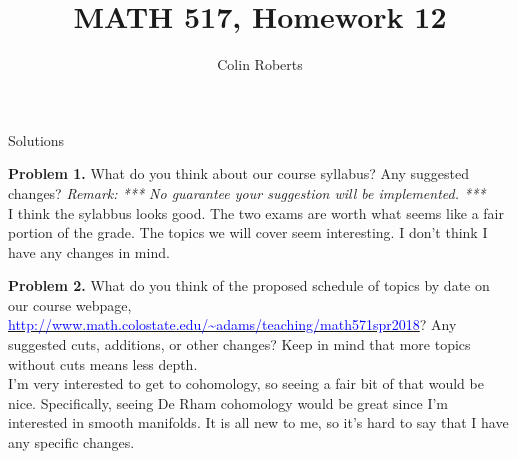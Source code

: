 \documentclass[leqno]{article}
\author{Colin Roberts}
\title{MATH 517, Homework 12}
\theoremstyle{nonumberplain}
\begin{document}
\maketitle
\begin{large}
\begin{center}
Solutions
\end{center}
\end{large}


\noindent\textbf{Problem 1.} What do you think about our course syllabus? Any suggested changes?
\emph{Remark: *** No guarantee your suggestion will be implemented. ***}\\

I think the sylabbus looks good.  The two exams are worth what seems like a fair portion of the grade.  The topics we will cover seem interesting.  I don't think I have any changes in mind.

\vspace*{1cm}







\noindent\textbf{Problem 2.} What do you think of the proposed schedule of topics by date on our course webpage, \href{http://www.math.colostate.edu/~adams/teaching/math571spr2018/}{\textcolor{blue}{http://www.math.colostate.edu/\textasciitilde adams/teaching/math571spr2018}}? Any suggested cuts, additions, or other changes? Keep in mind that more topics without cuts means less depth.\\

I'm very interested to get to cohomology, so seeing a fair bit of that would be nice. Specifically, seeing De Rham cohomology would be great since I'm interested in smooth manifolds.  It is all new to me, so it's hard to say that I have any specific changes.  
\end{document}
